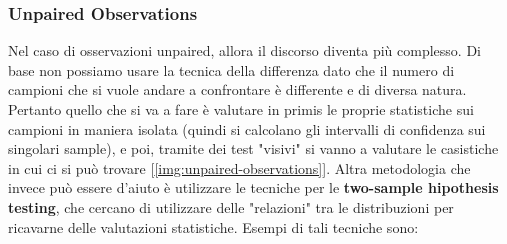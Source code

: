 \subsubsection{Unpaired Observations}
Nel caso di osservazioni unpaired, allora il discorso diventa più complesso. Di base non possiamo usare la tecnica della differenza dato che il numero di campioni che si vuole andare a confrontare è differente e di diversa natura. Pertanto quello che si va a fare è valutare in primis le proprie statistiche sui campioni in maniera isolata (quindi si calcolano gli intervalli di confidenza sui singolari sample), e poi, tramite dei test "visivi" si vanno a valutare le casistiche in cui ci si può trovare [\ref{img:unpaired-observations}].
Altra metodologia che invece può essere d'aiuto è utilizzare le tecniche per le \textbf{two-sample hipothesis testing}, che cercano di utilizzare delle "relazioni" tra le distribuzioni per ricavarne delle valutazioni statistiche.
Esempi di tali tecniche sono:
